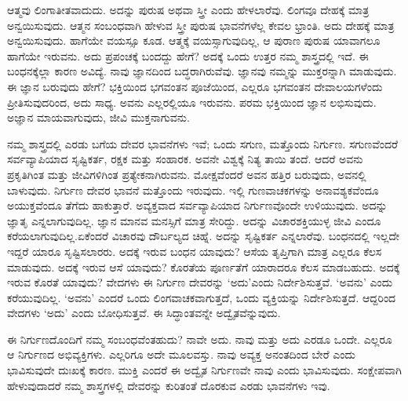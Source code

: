 ಆತ್ಮವು ಲಿಂಗಾತೀತವಾದುದು. ಅದನ್ನು ಪುರುಷ ಅಥವಾ ಸ್ತ್ರೀ ಎಂದು ಹೇಳಲಾರೆವು. ಲಿಂಗವೂ ದೇಹಕ್ಕೆ ಮಾತ್ರ ಅನ್ವಯಿಸುವುದು. ಆತ್ಮನ ಸಂಬಂಧವಾಗಿ ಹೇಳುವ ಸ್ತ್ರೀ ಪುರುಷ ಭಾವನೆಗಳೆಲ್ಲ ಕೇವಲ ಭ್ರಾಂತಿ. ಅದು ದೇಹಕ್ಕೆ ಮಾತ್ರ ಅನ್ವಯಿಸುವುದು. ಹಾಗೆಯೇ ವಯಸ್ಸೂ ಕೂಡ. ಆತ್ಮಕ್ಕೆ ವಯಸ್ಸಾಗುವುದಿಲ್ಲ, ಆ ಪುರಾಣ ಪುರುಷ ಯಾವಾಗಲೂ ಹಾಗೆಯೇ ಇರುವನು. ಅದು ಪ್ರಪಂಚಕ್ಕೆ ಬಂದದ್ದು ಹೇಗೆ? ಅದಕ್ಕೆ ಒಂದು ಉತ್ತರ ನಮ್ಮ ಶಾಸ್ತ್ರದಲ್ಲಿ ಇದೆ. ಈ ಬಂಧನಕ್ಕೆಲ್ಲಾ ಕಾರಣ ಅವಿದ್ಯೆ. ನಾವು ಜ್ಞಾನದಿಂದ ಬದ್ಧರಾಗಿರುವೆವು. ಜ್ಞಾನವು ನಮ್ಮನ್ನು ಮುಕ್ತರನ್ನಾಗಿ ಮಾಡುವುದು. ಈ ಜ್ಞಾನ ಬರುವುದು ಹೇಗೆ? ಭಕ್ತಿಯಿಂದ ಭಗವಂತನ ಪೂಜೆಯಿಂದ, ಎಲ್ಲರೂ ಭಗವಂತನ ದೇವಾಲಯಗಳೆಂದು ಪ್ರೀತಿಸುವುದರಿಂದ, ಅದು ಸಾಧ್ಯ. ಅವನು ಎಲ್ಲರಲ್ಲಿಯೂ ಇರುವನು. ಪರಮ ಭಕ್ತಿಯಿಂದ ಜ್ಞಾನ ಲಭಿಸುವುದು. ಅಜ್ಞಾನ ಮಾಯವಾಗುವುದು, ಜೀವಿ ಮುಕ್ತನಾಗುವನು. 

ನಮ್ಮ ಶಾಸ್ತ್ರದಲ್ಲಿ ಎರಡು ಬಗೆಯ ದೇವರ ಭಾವನೆಗಳು ಇವೆ; ಒಂದು ಸಗುಣ, ಮತ್ತೊಂದು ನಿರ್ಗುಣ. ಸಗುಣವೆಂದರೆ ಸರ್ವವ್ಯಾಪಿಯಾದ ಸೃಷ್ಟಿಕರ್ತ, ರಕ್ಷಕ ಮತ್ತು ಸಂಹಾರಕ. ಅವನೇ ವಿಶ್ವಕ್ಕೆ ನಿತ್ಯ ತಾಯಿ ತಂದೆ. ಆದರೆ ಅವನು ಪ್ರಕೃತಿಗಿಂತ ಮತ್ತು ಜೀವಿಗಳಿಗಿಂತ ಪ್ರತ್ಯೇಕನಾಗಿರುವನು. ಮೋಕ್ಷವೆಂದರೆ ಅವನ ಹತ್ತಿರ ಬರುವುದು, ಅವನಲ್ಲಿ ಬಾಳುವುದು. ನಿರ್ಗುಣ ದೇವರ ಭಾವನೆ ಮತ್ತೊಂದು ಇರುವುದು. ಇಲ್ಲಿ ಗುಣವಾಚಕಗಳನ್ನು ಅನಾವಶ್ಯಕವೆಂದೂ ಅಯುಕ್ತವೆಂದೂ ತೆಗೆದು ಹಾಕುತ್ತಾರೆ. ಅವ್ಯಕ್ತವಾದ ಸರ್ವವ್ಯಾಪಿಯಾದ ನಿರ್ಗುಣವೊಂದೇ ಉಳಿಯುವುದು. ಅದನ್ನು ಜ್ಞಾತೃ ಎನ್ನಲಾಗುವುದಿಲ್ಲ. ಜ್ಞಾನ ಮಾನವ ಮನಸ್ಸಿಗೆ ಮಾತ್ರ ಸೇರಿದ್ದು. ಅದನ್ನು ವಿಚಾರಶಕ್ತಿಯುಳ್ಳ ಜೀವಿ ಎಂದೂ ಕರೆಯಲಾಗುವುದಿಲ್ಲ.\break ಏಕೆಂದರೆ ವಿಚಾರವು ದೌರ್ಬಲ್ಯದ ಚಿಹ್ನೆ. ಅದನ್ನು ಸೃಷ್ಟಿಕರ್ತ ಎನ್ನಲಾರೆವು. ಬಂಧನದಲ್ಲಿ ಇಲ್ಲದೇ ಇದ್ದರೆ ಯಾರೂ ಸೃಷ್ಟಿಸಲಾರರು. ಅದಕ್ಕೆ ಇರುವ ಬಂಧನ ಯಾವುದು? ಆಸೆಯ ತೃಪ್ತಿಗಾಗಿ ಮಾತ್ರ ಎಲ್ಲರೂ ಕೆಲಸ ಮಾಡುವುದು. ಅದಕ್ಕೆ ಇರುವ ಆಸೆ ಯಾವುದು? ಕೊರತೆಯ ಪೂರ್ಣತೆಗೆ ಯಾರಾದರೂ ಕೆಲಸ ಮಾಡಬಹುದು. ಅದಕ್ಕೆ ಇರುವ ಕೊರತೆ ಯಾವುದು? ವೇದಗಳು ಈ ನಿರ್ಗುಣ ದೇವರನ್ನು ‘ಅದು’ಎಂದು ನಿರ್ದೇಶಿಸುತ್ತವೆ. ‘ಅವನು’ ಎಂದು ಕರೆಯುವುದಿಲ್ಲ. ‘ಅವನು’ ಎಂದರೆ ಒಂದು ಲಿಂಗವಾಚಕವಾಗುತ್ತದೆ, ಒಂದು ವ್ಯಕ್ತಿಯನ್ನು ನಿರ್ದೇಶಿಸುತ್ತದೆ. ಆದ್ದರಿಂದ ವೇದಗಳು ‘ಅದು’ ಎಂದು ಬೋಧಿಸುತ್ತವೆ. ಈ ಸಿದ್ಧಾಂತವನ್ನೇ ಅದ್ವೈತವೆನ್ನುವುದು. 

ಈ ನಿರ್ಗುಣದೊಂದಿಗೆ ನಮ್ಮ ಸಂಬಂಧವೆಂತಹುದು? ನಾವೇ ಅದು. ನಾವು ಮತ್ತು ಅದು ಎರಡೂ ಒಂದೇ. ಎಲ್ಲರೂ ಆ ನಿರ್ಗುಣದ ಅಭಿವ್ಯಕ್ತಿಗಳು. ಎಲ್ಲರಿಗೂ ಅದೇ ಮೂಲವಸ್ತು. ನಾವು ಅವ್ಯಕ್ತ ಅನಂತದಿಂದ ಬೇರೆ ಎಂದು ಭಾವಿಸುವುದೇ ದುಃಖಕ್ಕೆ ಕಾರಣ. ಮುಕ್ತಿ ಎಂದರೆ ಈ ಅದ್ವೈತ ನಿರ್ಗುಣವೇ ನಾವು ಎಂದು ಭಾವಿಸುವುದು. ಸಂಕ್ಷೇಪವಾಗಿ ಹೇಳುವುದಾದರೆ ನಮ್ಮ ಶಾಸ್ತ್ರಗಳಲ್ಲಿ ದೇವರನ್ನು ಕುರಿತಂತೆ ದೊರಕುವ ಎರಡು ಭಾವನೆಗಳು ಇವು. 

